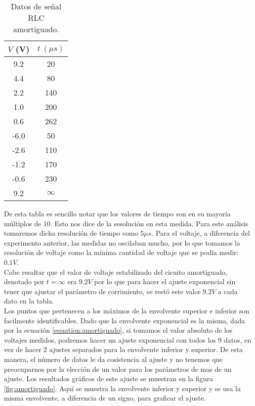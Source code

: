 \documentclass[%
 reprint,
 amsmath,amssymb,
 aps,
]{revtex4-1}
\begin{document}
\begin{table}[h!]
\centering
 \begin{tabular}{|c|c|} 
 \hline
 $V$ (V) & $t\ (\mu s)$ \\ [0.5ex] 
 \hline\hline
9.2&	20\\
4.4&	80\\
2.2&	140\\
1.0&	200\\
0.6&	262\\
-6.0&	50\\
-2.6&	110\\
-1.2&	170\\
-0.6&	230\\
9.2 & $\infty$ \\
[1ex] 
 \hline
 \end{tabular}
 \caption{Datos de señal RLC amortiguado.}
 \label{table:amortiguado}
\end{table}

De esta tabla es sencillo notar que los valores de tiempo son en su mayor\'ia m\'ultiplos de 10. Esto nos dice de la sesoluci\'on en esta medida. Para este an\'alisis tomaremos dicha resoluci\'on de tiempo como $5\mu s$. Para el voltaje, a diferencia del experimento anterior, las medidas no oscilaban mucho, por lo que tomamos la resoluci\'on de voltaje como la m\'inima cantidad de voltaje que se pod\'ia medir: $0.1V$.\\

Cabe resaltar que el valor de voltaje estabilizado del cicuito amortiguado, denotado por $t = \infty$ era $9.2 V$ por lo que para hacer el ajuste exponencial sin tener que ajustar el par\'ametro de corrimiento, se rest\'o este valor $9.2V$ a cada dato en la tabla.\\
  
Los puntos que pertenecen a los m\'aximos de la envolvente superior e inferior son facilmente identificables. Dado que la envolvente exponencial es la misma, dada por la ecuaci\'on \ref{equation:amortiguado}, si tomamos el valor absoluto de los voltajes medidos, podremos hacer un ajuste exponencial con todos los 9 datos, en vez de hacer 2 ajustes separados para la envolvente inferior y superior. De esta manera, el n\'umero de datos le da cosistencia al ajuste y no tenemos que preocuparnos por la elecci\'on de un valor para los par\'ametros de mas de un ajuste. Los resultados gr\'aficos de este ajuste se muestran en la figura \ref{fig:amortiguado}. Aqu\'i se muestra la envolvente inferior y superior y se usa la misma envolvente, a diferencia de un signo, para graficar el ajuste.\\
\end{document}
